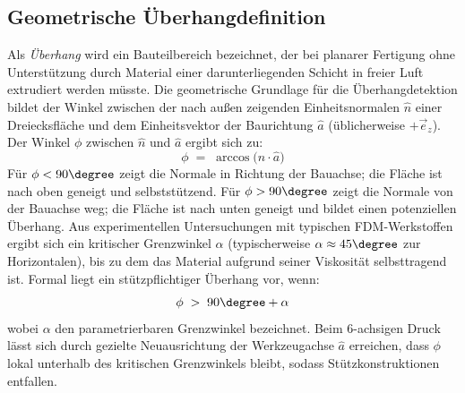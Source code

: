        \subsection{Geometrische Überhangdefinition}\label{subsec:overhang-definition}
        Als \emph{Überhang} wird ein Bauteilbereich bezeichnet,
        der bei planarer Fertigung ohne Unterstützung durch Material einer darunterliegenden Schicht
        in freier Luft extrudiert werden müsste.
        Die geometrische Grundlage für die Überhangdetektion bildet der Winkel zwischen der
        nach außen zeigenden Einheitsnormalen $\hat{n}$ einer Dreiecksfläche und dem Einheitsvektor
        der Baurichtung $\hat{a}$ (üblicherweise $+\vec{e}_z$).
        Der Winkel $\phi$ zwischen $\hat{n}$ und $\hat{a}$ ergibt sich zu:
        \begin{equation}
            \phi \;=\; \arccos\!\bigl(\hat{n} \cdot \hat{a}\bigr)
            \label{eq:overhang-angle}
        \end{equation}
        Für $\phi < 90\degree$ zeigt die Normale in Richtung der Bauachse; die Fläche ist nach oben geneigt und selbststützend.
        Für $\phi > 90\degree$ zeigt die Normale von der Bauachse weg; die Fläche ist nach unten geneigt
        und bildet einen potenziellen Überhang.
        Aus experimentellen Untersuchungen mit typischen \ac{FDM}-Werkstoffen ergibt sich ein kritischer
        Grenzwinkel $\alpha$ (typischerweise $\alpha \approx 45\degree$ zur Horizontalen),
        bis zu dem das Material aufgrund seiner Viskosität selbsttragend ist.
        Formal liegt ein stützpflichtiger Überhang vor, wenn:
        \begin{equation}
            \phi \;>\; 90\degree + \alpha
            \label{eq:critical-overhang}
        \end{equation}
        wobei $\alpha$ den parametrierbaren Grenzwinkel bezeichnet.
        Beim 6-achsigen Druck lässt sich durch gezielte Neuausrichtung der Werkzeugachse $\hat{a}$
        erreichen, dass $\phi$ lokal unterhalb des kritischen Grenzwinkels bleibt,
        sodass Stützkonstruktionen entfallen.
        \cite{gorskiExperimentalDeterminationCritical2015}
        \cite{vanekCleverSupportEfficient2014}

